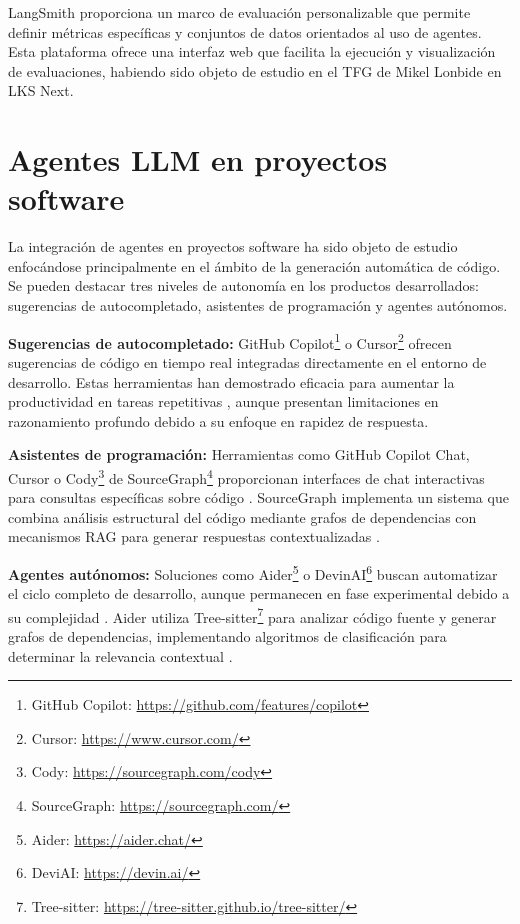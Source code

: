 LangSmith proporciona un marco de evaluación personalizable que permite definir métricas específicas y conjuntos de datos orientados al uso de agentes. Esta plataforma ofrece una interfaz web que facilita la ejecución y visualización de evaluaciones, habiendo sido objeto de estudio en el TFG de Mikel Lonbide en LKS Next.

\section{Agentes LLM en proyectos software}
La integración de agentes en proyectos software ha sido objeto de estudio enfocándose principalmente en el ámbito de la generación automática de código. Se pueden destacar tres niveles de autonomía en los productos desarrollados: sugerencias de autocompletado, asistentes de programación y agentes autónomos.

\textbf{Sugerencias de autocompletado:} GitHub Copilot\footnote{GitHub Copilot: \url{https://github.com/features/copilot}} o Cursor\footnote{Cursor: \url{https://www.cursor.com/}} ofrecen sugerencias de código en tiempo real integradas directamente en el entorno de desarrollo. Estas herramientas han demostrado eficacia para aumentar la productividad en tareas repetitivas \cite{kalliamvakou_research_2022}, aunque presentan limitaciones en razonamiento profundo debido a su enfoque en rapidez de respuesta.

\textbf{Asistentes de programación:} Herramientas como GitHub Copilot Chat, Cursor o Cody\footnote{Cody: \url{https://sourcegraph.com/cody}} de SourceGraph\footnote{SourceGraph: \url{https://sourcegraph.com/}} proporcionan interfaces de chat interactivas para consultas específicas sobre código \cite{noauthor_github_nodate}. SourceGraph implementa un sistema que combina análisis estructural del código mediante grafos de dependencias con mecanismos RAG para generar respuestas contextualizadas \cite{noauthor_sourcegraphscip_2025,noauthor_sourcegraphsourcegraph-public-snapshot_nodate}.

\textbf{Agentes autónomos:} Soluciones como Aider\footnote{Aider: \url{https://aider.chat/}} o DevinAI\footnote{DeviAI: \url{https://devin.ai/}} buscan automatizar el ciclo completo de desarrollo, aunque permanecen en fase experimental debido a su complejidad \cite{acharya_devin_2025}. Aider utiliza Tree-sitter\footnote{Tree-sitter: \url{https://tree-sitter.github.io/tree-sitter/}} para analizar código fuente y generar grafos de dependencias, implementando algoritmos de clasificación para determinar la relevancia contextual \cite{noauthor_building_2023}.

